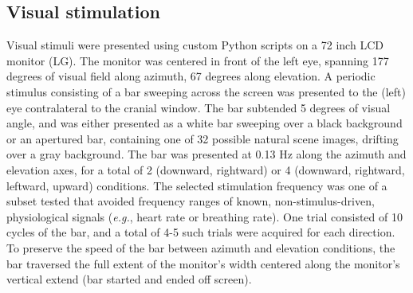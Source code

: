 
\subsection{Visual stimulation}
Visual stimuli were presented using custom Python scripts on a 72 inch LCD monitor (LG). The monitor was centered in front of the left eye, spanning 177 degrees of visual field along azimuth, 67 degrees along elevation. A periodic stimulus consisting of a bar sweeping across the screen \cite{Kalatsky2003, Marshel2011} was presented to the (left) eye contralateral to the cranial window. The bar subtended 5 degrees of visual angle, and was either presented as a white bar sweeping over a black background or an apertured bar, containing one of 32 possible natural scene images, drifting over a gray background. The bar was presented at 0.13 Hz along the azimuth and elevation axes, for a total of 2 (downward, rightward) or 4 (downward, rightward, leftward, upward) conditions. The selected stimulation frequency was one of a subset tested that avoided frequency ranges of known, non-stimulus-driven, physiological signals (\textit{e.g.}, heart rate or breathing rate). One trial consisted of 10 cycles of the bar, and a total of 4-5 such trials were acquired for each direction. To preserve the speed of the bar between azimuth and elevation conditions, the bar traversed the full extent of the monitor's width centered along the monitor's vertical extend (bar started and ended off screen). 

